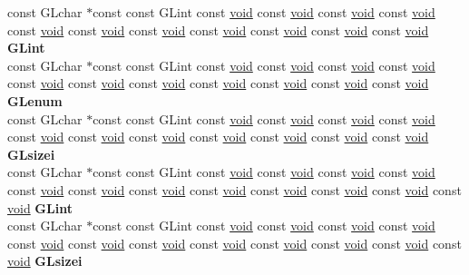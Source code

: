 \begin{DoxyCompactItemize}
\begin{tabbing}
\>const GLchar $\ast$const const GLint const \hyperlink{interfacevoid}{void} const \hyperlink{interfacevoid}{void} const \hyperlink{interfacevoid}{void} const \hyperlink{interfacevoid}{void} const \hyperlink{interfacevoid}{void} const \hyperlink{interfacevoid}{void} const \hyperlink{interfacevoid}{void} const \hyperlink{interfacevoid}{void} const \hyperlink{interfacevoid}{void} const \hyperlink{interfacevoid}{void} const \hyperlink{interfacevoid}{void} {\bfseries GLint}\\
\>const GLchar $\ast$const const GLint const \hyperlink{interfacevoid}{void} const \hyperlink{interfacevoid}{void} const \hyperlink{interfacevoid}{void} const \hyperlink{interfacevoid}{void} const \hyperlink{interfacevoid}{void} const \hyperlink{interfacevoid}{void} const \hyperlink{interfacevoid}{void} const \hyperlink{interfacevoid}{void} const \hyperlink{interfacevoid}{void} const \hyperlink{interfacevoid}{void} const \hyperlink{interfacevoid}{void} {\bfseries GLenum}\\
\>const GLchar $\ast$const const GLint const \hyperlink{interfacevoid}{void} const \hyperlink{interfacevoid}{void} const \hyperlink{interfacevoid}{void} const \hyperlink{interfacevoid}{void} const \hyperlink{interfacevoid}{void} const \hyperlink{interfacevoid}{void} const \hyperlink{interfacevoid}{void} const \hyperlink{interfacevoid}{void} const \hyperlink{interfacevoid}{void} const \hyperlink{interfacevoid}{void} const \hyperlink{interfacevoid}{void} {\bfseries GLsizei}\\
\>const GLchar $\ast$const const GLint const \hyperlink{interfacevoid}{void} const \hyperlink{interfacevoid}{void} const \hyperlink{interfacevoid}{void} const \hyperlink{interfacevoid}{void} const \hyperlink{interfacevoid}{void} const \hyperlink{interfacevoid}{void} const \hyperlink{interfacevoid}{void} const \hyperlink{interfacevoid}{void} const \hyperlink{interfacevoid}{void} const \hyperlink{interfacevoid}{void} const \hyperlink{interfacevoid}{void} const \hyperlink{interfacevoid}{void} {\bfseries GLint}\\
\>const GLchar $\ast$const const GLint const \hyperlink{interfacevoid}{void} const \hyperlink{interfacevoid}{void} const \hyperlink{interfacevoid}{void} const \hyperlink{interfacevoid}{void} const \hyperlink{interfacevoid}{void} const \hyperlink{interfacevoid}{void} const \hyperlink{interfacevoid}{void} const \hyperlink{interfacevoid}{void} const \hyperlink{interfacevoid}{void} const \hyperlink{interfacevoid}{void} const \hyperlink{interfacevoid}{void} const \hyperlink{interfacevoid}{void} {\bfseries GLsizei}\\

\end{tabbing}
\end{DoxyCompactItemize}
